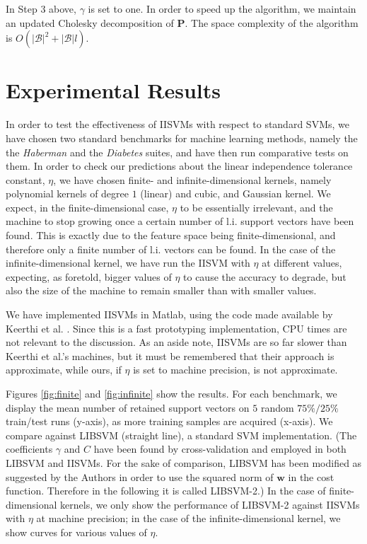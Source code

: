 \documentclass[10pt,twocolumn,letterpaper]{article}
\def\ww{\mathbf{w}}
\def\b{\mathcal{B}}
\begin{document}
In Step $3$ above, $\gamma$ is set to one. In order to speed up the
algorithm, we maintain an updated Cholesky decomposition of
$\mathbf{P}$. The space complexity of the algorithm is
$O(|\b|^2+|\b|l)$.

\section{Experimental Results}
\label{sec:exp}

In order to test the effectiveness of IISVMs with respect to standard
SVMs, we have chosen two standard benchmarks for machine learning
methods, namely the the \emph{Haberman} and the \emph{Diabetes}
suites, and have then run comparative tests on them. In order to check
our predictions about the linear independence tolerance constant,
$\eta$, we have chosen finite- and infinite-dimensional kernels,
namely polynomial kernels of degree $1$ (linear) and cubic, and
Gaussian kernel. We expect, in the finite-dimensional case, $\eta$ to
be essentially irrelevant, and the machine to stop growing once a
certain number of l.i. support vectors have been found. This is
exactly due to the feature space being finite-dimensional, and
therefore only a finite number of l.i. vectors can be found. In the
case of the infinite-dimensional kernel, we have run the IISVM with
$\eta$ at different values, expecting, as foretold, bigger values of
$\eta$ to cause the accuracy to degrade, but also the size of the
machine to remain smaller than with smaller values.

We have implemented IISVMs in Matlab, using the code made available by
Keerthi et al. \cite{KeerthiCDC06}. Since this is a fast prototyping
implementation, CPU times are not relevant to the discussion. As an
aside note, IISVMs are so far slower than Keerthi et al.'s machines,
but it must be remembered that their approach is approximate, while
ours, if $\eta$ is set to machine precision, is not approximate.

Figures \ref{fig:finite} and \ref{fig:infinite} show the results. For
each benchmark, we display the mean number of retained support vectors
on $5$ random $75\%/25\%$ train/test runs (y-axis), as more training
samples are acquired (x-axis). We compare against LIBSVM
\cite{ChangL01} (straight line), a standard SVM implementation. (The
coefficients $\gamma$ and $C$ have been found by cross-validation and
employed in both LIBSVM and IISVMs. For the sake of comparison, LIBSVM
has been modified as suggested by the Authors in order to use the
squared norm of $\ww$ in the cost function. Therefore in the following
it is called LIBSVM-2.) In the case of finite-dimensional kernels, we
only show the performance of LIBSVM-2 against IISVMs with $\eta$ at
machine precision; in the case of the infinite-dimensional kernel, we
show curves for various values of $\eta$.
\end{document}
